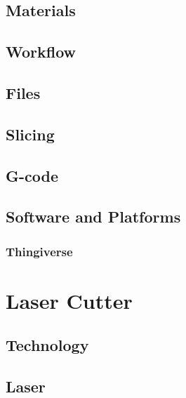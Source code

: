 \documentclass[aspectratio=169]{beamer}
\begin{document}
\subsection{}

\subsection{}

\subsection{Materials}

\subsection{Workflow}

\subsection{ Files}

\subsection{Slicing}

\subsection{G-code}

\subsection{Software and Platforms}
\subsubsection{Thingiverse}

\subsubsection{}


\section{Laser Cutter}

\subsection{Technology}

\subsection{Laser}

\end{document}
